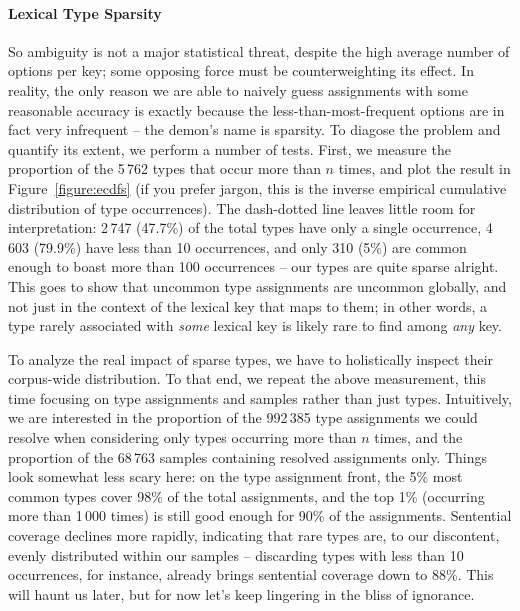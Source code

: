 \paragraph{Lexical Type Sparsity}
So ambiguity is not a major statistical threat, despite the high average number of options per key; some opposing force must be counterweighting its effect.
In reality, the only reason we are able to naively guess assignments with some reasonable accuracy is exactly because the less-than-most-frequent options are in fact very infrequent -- the demon's name is sparsity.
To diagose the problem and quantify its extent, we perform a number of tests.
First, we measure the proportion of the 5\,762 types that occur more than $n$ times, and plot the result in Figure~\ref{figure:ecdfs} (if you prefer jargon, this is the inverse empirical cumulative distribution of type occurrences).
The dash-dotted line leaves little room for interpretation: 2\,747 (47.7\%) of the total types have only a single occurrence, 4\,603 (79.9\%)  have less than 10 occurrences, and only 310 (5\%) are common enough to boast more than 100 occurrences -- our types are quite sparse alright.
This goes to show that uncommon type assignments are uncommon globally, and not just in the context of the lexical key that maps to them; in other words, a type rarely associated with \textit{some} lexical key is likely rare to find among \textit{any} key.

To analyze the real impact of sparse types, we have to holistically inspect their corpus-wide distribution.
To that end, we repeat the above measurement, this time focusing on type assignments and samples rather than just types.
Intuitively, we are interested in the proportion of the 992\,385 type assignments we could resolve when considering only types occurring more than $n$ times, and the proportion of the 68\,763 samples containing resolved assignments only. 
Things look somewhat less scary here: on the type assignment front, the 5\% most common types cover 98\% of the total assignments, and the top 1\% (occurring more than 1\,000 times) is still good enough for 90\% of the assignments.
Sentential coverage declines more rapidly, indicating that rare types are, to our discontent, evenly distributed within our samples -- discarding types with less than 10 occurrences, for instance, already brings sentential coverage down to 88\%.
This will haunt us later, but for now let's keep lingering in the bliss of ignorance.


